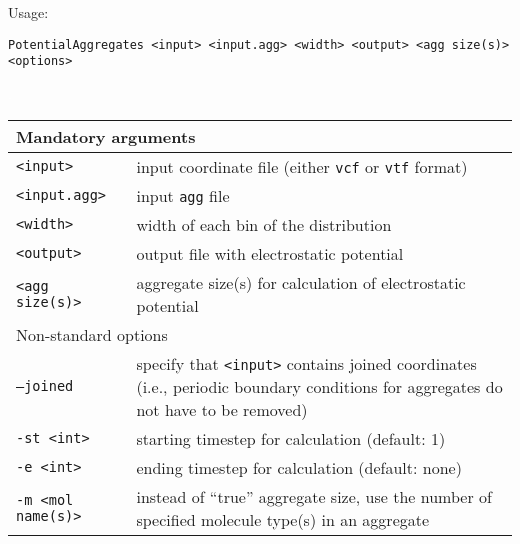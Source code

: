 Usage:

\vspace{1em}
\noindent
\texttt{PotentialAggregates <input> <input.agg> <width> <output> <agg
size(s)> <options>}

\textcolor{white}{.} %
\vspace{-1em}        %

\noindent
\begin{longtable}{p{}p{}}
  \toprule
  \multicolumn{2}{l}{Mandatory arguments} \\
  \midrule
  \texttt{<input>} & input coordinate file (either \texttt{vcf} or
    \texttt{vtf} format) \\
  \texttt{<input.agg>} & input \texttt{agg} file \\
  \texttt{<width>} & width of each bin of the distribution \\
  \texttt{<output>} & output file with electrostatic potential \\
  \texttt{<agg size(s)>} & aggregate size(s) for calculation of
  electrostatic potential \\
  \toprule
  \multicolumn{2}{l}{Non-standard options} \\
  \midrule
  \texttt{--joined} & specify that \texttt{<input>} contains joined
    coordinates (i.e., periodic boundary conditions for aggregates do not
    have to be removed) \\
  \texttt{-st <int>} & starting timestep for calculation (default: 1) \\
  \texttt{-e <int>} & ending timestep for calculation (default: none) \\
  \texttt{-m <mol name(s)>} & instead of \enquote{true} aggregate size, use
    the number of specified molecule type(s) in an aggregate \\
  \bottomrule
\end{longtable}

